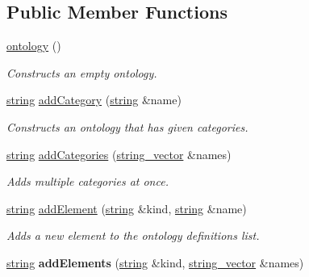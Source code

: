 \subsection*{\-Public \-Member \-Functions}
\begin{DoxyCompactItemize}
\item 
\hypertarget{classmbdev__ontology_1_1ontology_ae12bee76ef6eb38b770afa9377fa37ad}{\hyperlink{classmbdev__ontology_1_1ontology_ae12bee76ef6eb38b770afa9377fa37ad}{ontology} ()}\label{classmbdev__ontology_1_1ontology_ae12bee76ef6eb38b770afa9377fa37ad}

\begin{DoxyCompactList}\small\item\em \-Constructs an empty ontology. \end{DoxyCompactList}\item 
\hyperlink{classmbdev_1_1string}{string} \hyperlink{classmbdev__ontology_1_1ontology_a9b2644fa7844b5024bc1c03273e0912d}{add\-Category} (\hyperlink{classmbdev_1_1string}{string} \&name)
\begin{DoxyCompactList}\small\item\em \-Constructs an ontology that has given categories. \end{DoxyCompactList}\item 
\hypertarget{classmbdev__ontology_1_1ontology_aeadc577d640dec083d2f724a05615777}{\hyperlink{classmbdev_1_1string}{string} \hyperlink{classmbdev__ontology_1_1ontology_aeadc577d640dec083d2f724a05615777}{add\-Categories} (\hyperlink{classmbdev_1_1string__vector}{string\-\_\-vector} \&names)}\label{classmbdev__ontology_1_1ontology_aeadc577d640dec083d2f724a05615777}

\begin{DoxyCompactList}\small\item\em \-Adds multiple categories at once. \end{DoxyCompactList}\item 
\hyperlink{classmbdev_1_1string}{string} \hyperlink{classmbdev__ontology_1_1ontology_aeb353a93019334cdcf01a1c9508077a7}{add\-Element} (\hyperlink{classmbdev_1_1string}{string} \&kind, \hyperlink{classmbdev_1_1string}{string} \&name)
\begin{DoxyCompactList}\small\item\em \-Adds a new element to the ontology definitions list. \end{DoxyCompactList}\item 
\hypertarget{classmbdev__ontology_1_1ontology_ab6e37f2d5c7bbdc54ca95c24c735efae}{\hyperlink{classmbdev_1_1string}{string} {\bfseries add\-Elements} (\hyperlink{classmbdev_1_1string}{string} \&kind, \hyperlink{classmbdev_1_1string__vector}{string\-\_\-vector} \&names)}\label{classmbdev__ontology_1_1ontology_ab6e37f2d5c7bbdc54ca95c24c735efae}


\end{DoxyCompactItemize}
